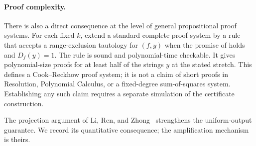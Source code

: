 \documentclass[letterpaper,11pt]{article}
\theoremstyle{definition}
\begin{document}
\paragraph{Proof complexity.}
There is also a direct consequence at the level of general
propositional proof systems. For each fixed $k$, extend a standard
complete proof system by a rule that accepts a range-exclusion
tautology for $(f,y)$ when the promise of  holds
and $D_f(y)=1$. The rule is sound and polynomial-time checkable.
It gives polynomial-size proofs for at least half of the strings
$y$ at the stated stretch. This defines a Cook--Reckhow proof system;
it is not a claim of short proofs in Resolution, Polynomial Calculus,
or a fixed-degree sum-of-squares system. Establishing any such claim
requires a separate simulation of the certificate construction.

The projection argument of Li, Ren, and
Zhong~\cite[Theorem~3.2 and Section~4]{LRZ26} strengthens the
uniform-output guarantee. We record its quantitative consequence;
the amplification mechanism is theirs.
\end{document}
